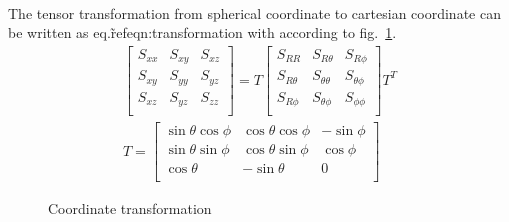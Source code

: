 \paragraph{}
The tensor transformation from spherical coordinate to cartesian coordinate can be written as eq.\~ref{eqn:transformation} with according to fig.~\ref{octree_fig:oct_ex_hollow_sphere_tran}.
\begin{subequations}
  \begin{align}
    \begin{bmatrix}
      S_{xx} & S_{xy} & S_{xz} \\
      S_{xy} & S_{yy} & S_{yz} \\
      S_{xz} & S_{yz} & S_{zz} \\
    \end{bmatrix} = T\begin{bmatrix}
      S_{RR} & S_{R\theta} & S_{R\phi} \\
      S_{R\theta} & S_{\theta\theta} & S_{\theta\phi}\\
      S_{R\phi} & S_{\theta\phi} & S_{\phi\phi} \\
    \end{bmatrix} T^T\\
  T = 
\begin{bmatrix}
\sin\theta\cos\phi & \cos\theta\cos\phi & -\sin\phi \\
\sin\theta\sin\phi & \cos\theta\sin\phi & \cos\phi  \\
\cos\theta & -\sin\theta & 0 \\
\end{bmatrix}
\end{align}
\label{eqn:transformation}
\end{subequations}

\begin{figure}[h!]
    \centering
    \caption{Coordinate transformation}
    \label{octree_fig:oct_ex_hollow_sphere_tran}
  \end{figure}
  
